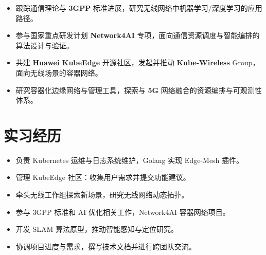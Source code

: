 \documentclass{resume}
\begin{document}
\begin{itemize}[parsep=0.5ex]
  \item 跟踪通信理论与 \textbf{3GPP} 标准进展，研究无线网络中机器学习/深度学习的应用路径。
  \item 参与国家重点研发计划 \textbf{Network4AI} 专项，面向通信资源调度与智能编排的算法设计与验证。
  \item 共建 \textbf{Huawei KubeEdge} 开源社区，发起并推动 \textbf{Kube-Wireless} Group，面向无线场景的容器网络。
  \item 研究容器化边缘网络与管理工具，探索与 \textbf{5G} 网络融合的资源编排与可观测性体系。
\end{itemize}
\vspace{3mm}


\section{实习经历}
\begin{itemize}[parsep=0.5ex]
  \item 负责 Kubernetes 运维与日志系统维护，Golang 实现 Edge-Mesh 插件。
  \item 管理 KubeEdge 社区：收集用户需求并提交功能建议。
  \item 牵头无线工作组探索新场景，研究无线网络动态拓扑。
\end{itemize}

\begin{itemize}[parsep=0.5ex]
  \item 参与 3GPP 标准和 AI 优化相关工作，Network4AI 容器网络项目。
  \item 开发 SLAM 算法原型，推动智能感知与定位研究。
  \item 协调项目进度与需求，撰写技术文档并进行跨团队交流。
\end{itemize}\\
\vspace{3mm}
\end{document}
